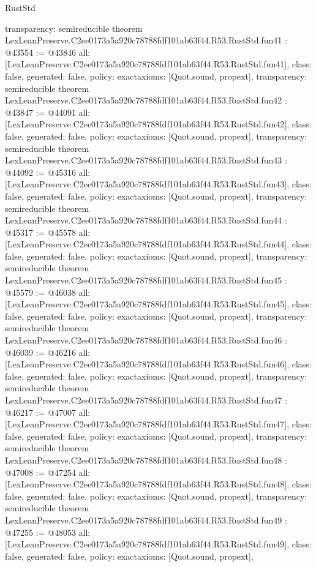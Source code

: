 \begin{lexlean}{RustStd}
\begin{coremodule}
{  transparency: semireducible
}
theorem LexLeanPreserve.C2ee0173a5a920c78788fdf101ab63f44.R53.RustStd.fun41 : @43554 := @43846 {
  all: [LexLeanPreserve.C2ee0173a5a920c78788fdf101ab63f44.R53.RustStd.fun41],
  class: false,
  generated: false,
  policy: exact{axioms: [Quot.sound, propext]},
  transparency: semireducible
}
theorem LexLeanPreserve.C2ee0173a5a920c78788fdf101ab63f44.R53.RustStd.fun42 : @43847 := @44091 {
  all: [LexLeanPreserve.C2ee0173a5a920c78788fdf101ab63f44.R53.RustStd.fun42],
  class: false,
  generated: false,
  policy: exact{axioms: [Quot.sound, propext]},
  transparency: semireducible
}
theorem LexLeanPreserve.C2ee0173a5a920c78788fdf101ab63f44.R53.RustStd.fun43 : @44092 := @45316 {
  all: [LexLeanPreserve.C2ee0173a5a920c78788fdf101ab63f44.R53.RustStd.fun43],
  class: false,
  generated: false,
  policy: exact{axioms: [Quot.sound, propext]},
  transparency: semireducible
}
theorem LexLeanPreserve.C2ee0173a5a920c78788fdf101ab63f44.R53.RustStd.fun44 : @45317 := @45578 {
  all: [LexLeanPreserve.C2ee0173a5a920c78788fdf101ab63f44.R53.RustStd.fun44],
  class: false,
  generated: false,
  policy: exact{axioms: [Quot.sound, propext]},
  transparency: semireducible
}
theorem LexLeanPreserve.C2ee0173a5a920c78788fdf101ab63f44.R53.RustStd.fun45 : @45579 := @46038 {
  all: [LexLeanPreserve.C2ee0173a5a920c78788fdf101ab63f44.R53.RustStd.fun45],
  class: false,
  generated: false,
  policy: exact{axioms: [Quot.sound, propext]},
  transparency: semireducible
}
theorem LexLeanPreserve.C2ee0173a5a920c78788fdf101ab63f44.R53.RustStd.fun46 : @46039 := @46216 {
  all: [LexLeanPreserve.C2ee0173a5a920c78788fdf101ab63f44.R53.RustStd.fun46],
  class: false,
  generated: false,
  policy: exact{axioms: [Quot.sound, propext]},
  transparency: semireducible
}
theorem LexLeanPreserve.C2ee0173a5a920c78788fdf101ab63f44.R53.RustStd.fun47 : @46217 := @47007 {
  all: [LexLeanPreserve.C2ee0173a5a920c78788fdf101ab63f44.R53.RustStd.fun47],
  class: false,
  generated: false,
  policy: exact{axioms: [Quot.sound, propext]},
  transparency: semireducible
}
theorem LexLeanPreserve.C2ee0173a5a920c78788fdf101ab63f44.R53.RustStd.fun48 : @47008 := @47254 {
  all: [LexLeanPreserve.C2ee0173a5a920c78788fdf101ab63f44.R53.RustStd.fun48],
  class: false,
  generated: false,
  policy: exact{axioms: [Quot.sound, propext]},
  transparency: semireducible
}
theorem LexLeanPreserve.C2ee0173a5a920c78788fdf101ab63f44.R53.RustStd.fun49 : @47255 := @48053 {
  all: [LexLeanPreserve.C2ee0173a5a920c78788fdf101ab63f44.R53.RustStd.fun49],
  class: false,
  generated: false,
  policy: exact{axioms: [Quot.sound, propext]},
}
\end{coremodule}
\end{lexlean}
